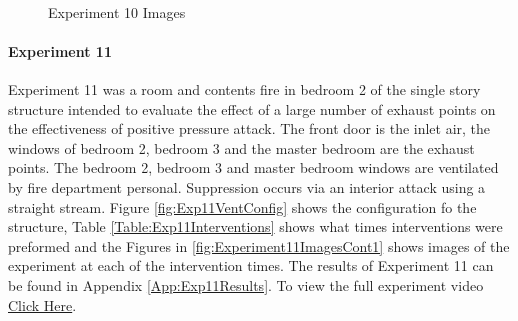\documentclass{article}
\begin{document}
\begin{figure}[H]
	\ContinuedFloat 
	\centering 
	 \ 
	 \ 
	\caption{Experiment 10 Images}
	\label{fig:Experiment10ImagesCont3} 
\end{figure}

\paragraph{Experiment 11}\mbox{}

Experiment 11 was a room and contents fire in bedroom 2 of the single story structure intended to evaluate the effect of a large number of exhaust points on the effectiveness of positive pressure attack. The front door is the inlet air, the windows of bedroom 2, bedroom 3 and the master bedroom are the exhaust points. The bedroom 2, bedroom 3 and master bedroom windows are ventilated by fire department personal. Suppression occurs via an interior attack using a straight stream. Figure \ref{fig:Exp11VentConfig} shows the configuration fo the structure, Table \ref{Table:Exp11Interventions} shows what times interventions were preformed and the Figures in \ref{fig:Experiment11ImagesCont1} shows images of the experiment at each of the intervention times. The results of Experiment 11 can be found in Appendix \ref{App:Exp11Results}. To view the full experiment video \href{https://youtu.be/XlgvKuJ40kU}{Click Here}.
\end{document}
